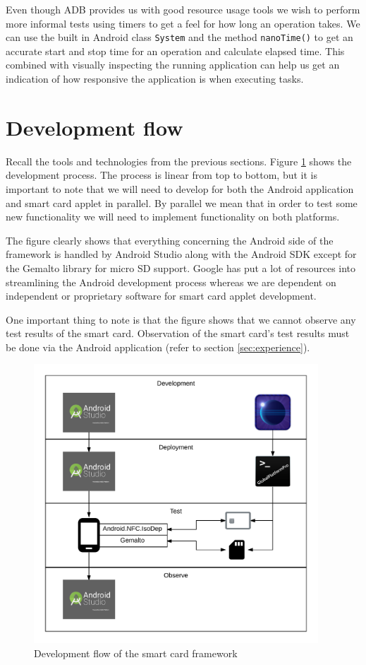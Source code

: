 Even though ADB provides us with good resource usage tools we wish to perform more informal tests using timers to get a feel for how long an operation takes. We can use the built in Android class \texttt{System} and the method \texttt{nanoTime()} to get an accurate start and stop time for an operation and calculate elapsed time. This combined with visually inspecting the running application can help us get an indication of how responsive the application is when executing tasks.

\section{Development flow}
Recall the tools and technologies from the previous sections. Figure \ref{fig:devFlow} shows the development process. The process is linear from top to bottom, but it is important to note that we will need to develop for both the Android application and smart card applet in parallel. By parallel we mean that in order to test some new functionality we will need to implement functionality on both platforms.

The figure clearly shows that everything concerning the Android side of the framework is handled by Android Studio along with the Android SDK except for the Gemalto library for micro SD support. Google has put a lot of resources into streamlining the Android development process whereas we are dependent on independent or proprietary software for smart card applet development.

One important thing to note is that the figure shows that we cannot observe any test results of the smart card. Observation of the smart card's test results must be done via the Android application (refer to section \ref{sec:experience}).

\begin{figure}[h!]
  \caption{Development flow of the smart card framework}
  \label{fig:devFlow}
  \centering
    \includegraphics[width=0.95\textwidth]{images/devFlow.png}
\end{figure}
